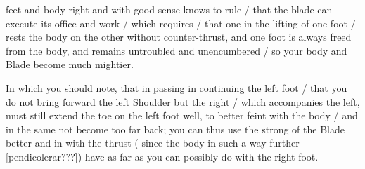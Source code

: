 \newpage


\newpage



feet and body right and with good sense knows to rule / that the 
blade can execute its office and work / which requires / that one in the
lifting of one foot / rests the body on the other without
counter-thrust, and one foot is
always freed from the body, and remains untroubled and unencumbered /
so your body and Blade become much mightier.


In which you should note, that in passing in continuing the left foot
/ that you do not bring forward the left Shoulder but the right /
which accompanies the left, must still extend the toe on the left foot
well, to better feint with the body / and in the same not become too
far back; you can thus use the strong of the Blade better and in with
the thrust ( since the body in such a way further [pendicolerar???])
have as far as you can possibly do with the right foot.

